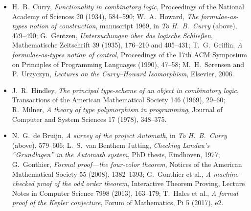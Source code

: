 \begin{itemize}
\item H.~B.~Curry, \emph{Functionality in combinatory logic}, Proceedings of the National Academy of Sciences 20 (1934), 584--590; W.~A.~Howard, \emph{The formulae-as-types notion of construction}, manuscript 1969, in \emph{To H.~B.~Curry} (above), 479--490; G.~Gentzen, \emph{Untersuchungen über das logische Schließen}, Mathematische Zeitschrift 39 (1935), 176--210 and 405--431; T.~G.~Griffin, \emph{A formulae-as-types notion of control}, Proceedings of the 17th ACM Symposium on Principles of Programming Languages (1990), 47--58; M.~H.~S{\o}rensen and P.~Urzyczyn, \emph{Lectures on the Curry--Howard Isomorphism}, Elsevier, 2006.
\item J.~R.~Hindley, \emph{The principal type-scheme of an object in combinatory logic}, Transactions of the American Mathematical Society 146 (1969), 29--60; R.~Milner, \emph{A theory of type polymorphism in programming}, Journal of Computer and System Sciences 17 (1978), 348--375.
\item N.~G.~de Bruijn, \emph{A survey of the project Automath}, in \emph{To H.~B.~Curry} (above), 579--606; L.~S.~van Benthem Jutting, \emph{Checking Landau's ``Grundlagen'' in the Automath system}, PhD thesis, Eindhoven, 1977; G.~Gonthier, \emph{Formal proof---the four-color theorem}, Notices of the American Mathematical Society 55 (2008), 1382--1393; G.~Gonthier et al., \emph{A machine-checked proof of the odd order theorem}, Interactive Theorem Proving, Lecture Notes in Computer Science 7998 (2013), 163--179; T.~Hales et al., \emph{A formal proof of the Kepler conjecture}, Forum of Mathematics, Pi 5 (2017), e2.
\end{itemize}
